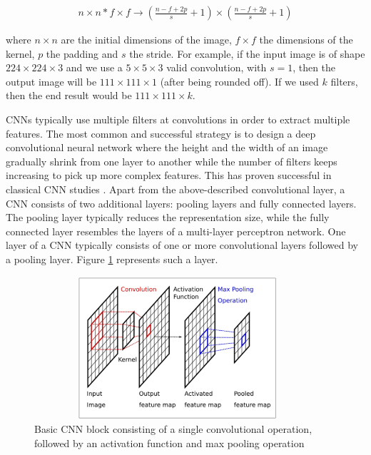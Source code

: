 \documentclass[extern,palatino]{cgMA}
\begin{document}
\begin{align*}
    n \times n * f \times f \rightarrow (\frac{n-f+2p}{s} + 1) \times (\frac{n-f+2p}{s} + 1)
\end{align*}

where $n \times n$ are the initial dimensions of the image, $f \times f$ the dimensions of the kernel, $p$ the padding and $s$ the stride. For example, if the input image is of shape $224 \times 224 \times 3$ and we use a $5 \times 5 \times 3$ valid convolution, with $s=1$, then the output image will be $111 \times 111 \times 1$ (after being rounded off). If we used $k$ filters, then the end result would be $111 \times 111 \times k$.

CNNs typically use multiple filters at convolutions in order to extract multiple features. The most common and successful strategy is to design a deep convolutional neural network where the height and the width of an image gradually shrink from one layer to another while the number of filters keeps increasing to pick up more complex features. This has proven successful in classical CNN studies \cite{lecun1998gradient} \cite{krizhevsky2012imagenet} \cite{simonyan2014very}. Apart from the above-described convolutional layer, a CNN consists of two additional layers: pooling layers and fully connected layers. The pooling layer typically reduces the representation size, while the fully connected layer resembles the layers of a multi-layer perceptron network. One layer of a CNN typically consists of one or more convolutional layers followed by a pooling layer. Figure \ref{cnn_block} represents such a layer.

\begin{figure}[h]
\center
\includegraphics[height={150pt}, width={300pt}]{images/cnn_block.png}
\caption{Basic CNN block consisting of a single convolutional operation, followed by an activation function and max pooling operation \cite{georgiou2020survey}}
\label{cnn_block}
\end{figure}
\end{document}
